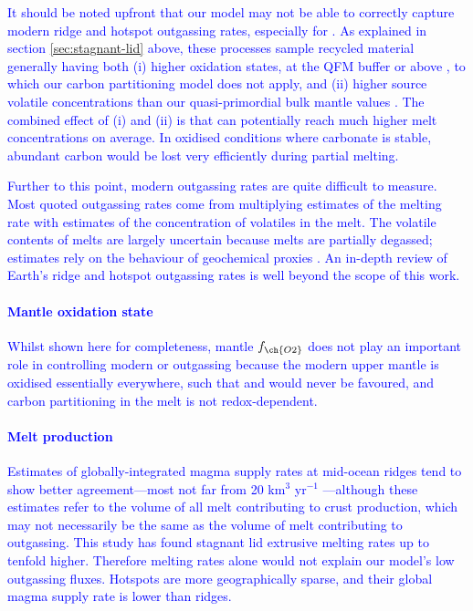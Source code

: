 \documentclass[3p,authoryear]{elsarticle}
\newcommand{\editthree}[2]{\textcolor{blue}{\sout{#1}#2}}
\begin{document}
\editthree{}{It should be noted upfront that our model may not be able to correctly capture modern ridge and hotspot outgassing rates, especially for \ch{CO2}. As explained in section \ref{sec:stagnant-lid} above, these processes sample recycled material generally having both (i) higher oxidation states, at the QFM buffer or above \citep{AMUNDSEN1992, MOUSSALLAM2016, ONEILL2018, MOUSSALLAM2019}, to which our carbon partitioning model does not apply, and (ii) higher source volatile concentrations than our quasi-primordial bulk mantle values \citep{Hauri2019}. The combined effect of (i) and (ii) is that \ch{CO2} can potentially reach much higher melt concentrations on average. In oxidised conditions where carbonate is stable, abundant carbon would be lost very efficiently during partial melting.}



\editthree{}{Further to this point, modern outgassing rates are quite difficult to measure. Most quoted outgassing rates come from multiplying estimates of the melting rate with estimates of the concentration of volatiles in the melt. The volatile contents of melts are largely uncertain because melts are partially degassed; estimates rely on the behaviour of geochemical proxies \citep[see][]{Michael2015}. An in-depth review of Earth's ridge and hotspot outgassing rates is well beyond the scope of this work.}

\editthree{}{\paragraph{Mantle oxidation state} Whilst shown here for completeness, mantle $f_{\ch{O2}}$ does not play an important role in controlling modern \ch{CO2} or \ch{H2O} outgassing because the modern upper mantle is oxidised essentially everywhere, such that \ch{H2} and \ch{CO} would never be favoured, and carbon partitioning in the melt is not redox-dependent.} 

\editthree{}{\paragraph{Melt production} Estimates of globally-integrated magma supply rates at mid-ocean ridges tend to show better agreement---most not far from 20 km$^3$ yr$^{-1}$ \citep{Crisp1984, Mjelde2010, Voyer2019}---although these estimates refer to the volume of all melt contributing to crust production, which may not necessarily be the same as the volume of melt contributing to outgassing. This study has found stagnant lid extrusive melting rates up to tenfold higher. Therefore melting rates alone would not explain our model's low outgassing fluxes. Hotspots are more geographically sparse, and their global magma supply rate is lower than ridges.}
\end{document}
